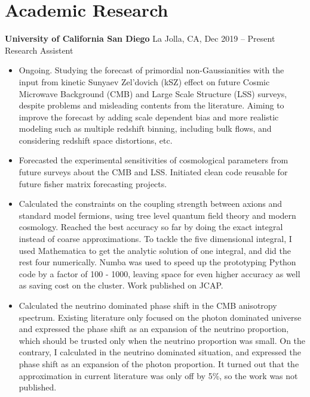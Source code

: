 \documentclass[letterpaper,12pt]{article}
\newenvironment{zitemize}{
\begin{itemize} \vspace{-.9em}\itemsep 0pt \parskip 0pt}
{\end{itemize}\vspace{-.5em}}
\begin{document}
\section{Academic Research}
\textbf{University of California San Diego} \hfill La Jolla, CA, Dec 2019 -- Present \\
Research Assistent \\
\begin{zitemize}
\item Ongoing. Studying the forecast of primordial non-Gaussianities with the input from kinetic Sunyaev Zel’dovich (kSZ) effect on future Cosmic Microwave Background (CMB) and Large Scale Structure (LSS) surveys, despite problems and misleading contents from the literature. Aiming to improve the forecast by adding scale dependent bias and more realistic modeling such as multiple redshift binning, including bulk flows, and considering redshift space distortions, etc.
\item Forecasted the experimental sensitivities of cosmological parameters from future surveys about the CMB and LSS. Initiated clean code reusable for future fisher matrix forecasting projects. 
\item Calculated the constraints on the coupling strength between axions and standard model fermions, using tree level quantum field theory and modern cosmology. Reached the best accuracy so far by doing the exact integral instead of coarse approximations. To tackle the five dimensional integral, I used Mathematica to get the analytic solution of one integral, and did the rest four numerically. Numba was used to speed up the prototyping Python code by a factor of 100 - 1000, leaving space for even higher accuracy as well as saving cost on the cluster. Work published on JCAP.
\item Calculated the neutrino dominated phase shift in the CMB anisotropy spectrum. Existing literature only focused on the photon dominated universe and expressed the phase shift as an expansion of the neutrino proportion, which should be trusted only when the neutrino proportion was small. On the contrary, I calculated in the neutrino dominated situation, and expressed the phase shift as an expansion of the photon proportion. It turned out that the approximation in current literature was only off by 5\%, so the work was not published.
\end{zitemize}
\end{document}
